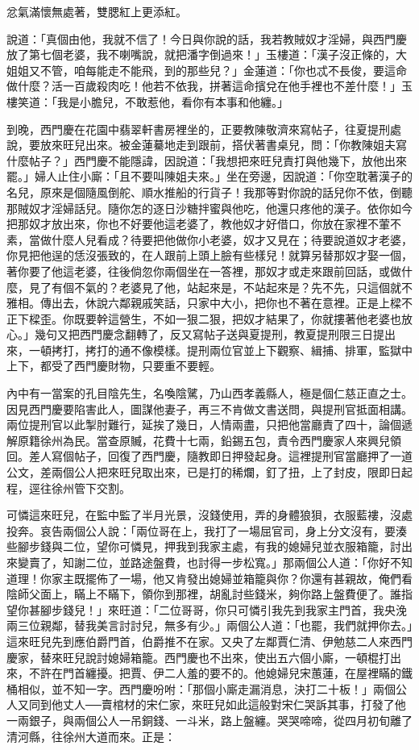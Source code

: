 忿氣滿懷無處著，雙腮紅上更添紅。

說道：「真個由他，我就不信了！今日與你說的話，我若教賊奴才淫婦，與西門慶放了第七個老婆，我不喇嘴說，就把潘字倒過來！」玉樓道：「漢子沒正條的，大姐姐又不管，咱每能走不能飛，到的那些兒？」金蓮道：「你也忒不長俊，要這命做什麼？活一百歲殺肉吃！他若不依我，拼著這命擯兌在他手裡也不差什麼！」玉樓笑道：「我是小膽兒，不敢惹他，看你有本事和他纏。」

到晚，西門慶在花園中翡翠軒書房裡坐的，正要教陳敬濟來寫帖子，往夏提刑處說，要放來旺兒出來。被金蓮驀地走到跟前，搭伏著書桌兒，問：「你教陳姐夫寫什麼帖子？」西門慶不能隱諱，因說道：「我想把來旺兒責打與他幾下，放他出來罷。」婦人止住小廝：「且不要叫陳姐夫來。」坐在旁邊，因說道：「你空耽著漢子的名兒，原來是個隨風倒舵、順水推船的行貨子！我那等對你說的話兒你不依，倒聽那賊奴才淫婦話兒。隨你怎的逐日沙糖拌蜜與他吃，他還只疼他的漢子。依你如今把那奴才放出來，你也不好要他這老婆了，教他奴才好借口，你放在家裡不葷不素，當做什麼人兒看成？待要把他做你小老婆，奴才又見在；待要說道奴才老婆，你見把他逞的恁沒張致的，在人跟前上頭上臉有些樣兒！就算另替那奴才娶一個，著你要了他這老婆，往後倘忽你兩個坐在一答裡，那奴才或走來跟前回話，或做什麼，見了有個不氣的？老婆見了他，站起來是，不站起來是？先不先，只這個就不雅相。傳出去，休說六鄰親戚笑話，只家中大小，把你也不著在意裡。正是上樑不正下樑歪。你既要幹這營生，不如一狠二狠，把奴才結果了，你就摟著他老婆也放心。」幾句又把西門慶念翻轉了，反又寫帖子送與夏提刑，教夏提刑限三日提出來，一頓拷打，拷打的通不像模樣。提刑兩位官並上下觀察、緝捕、排軍，監獄中上下，都受了西門慶財物，只要重不要輕。

內中有一當案的孔目陰先生，名喚陰騭，乃山西孝義縣人，極是個仁慈正直之士。因見西門慶要陷害此人，圖謀他妻子，再三不肯做文書送問，與提刑官抵面相講。兩位提刑官以此掣肘難行，延挨了幾日，人情兩盡，只把他當廳責了四十，論個遞解原籍徐州為民。當查原贓，花費十七兩，鉛錫五包，責令西門慶家人來興兒領回。差人寫個帖子，回復了西門慶，隨教即日押發起身。這裡提刑官當廳押了一道公文，差兩個公人把來旺兒取出來，已是打的稀爛，釘了扭，上了封皮，限即日起程，逕往徐州管下交割。

可憐這來旺兒，在監中監了半月光景，沒錢使用，弄的身體狼狽，衣服藍褸，沒處投奔。哀告兩個公人說：「兩位哥在上，我打了一場屈官司，身上分文沒有，要湊些腳步錢與二位，望你可憐見，押我到我家主處，有我的媳婦兒並衣服箱籠，討出來變賣了，知謝二位，並路途盤費，也討得一步松寬。」那兩個公人道：「你好不知道理！你家主既擺佈了一場，他又肯發出媳婦並箱籠與你？你還有甚親故，俺們看陰師父面上，瞞上不瞞下，領你到那裡，胡亂討些錢米，夠你路上盤費便了。誰指望你甚腳步錢兒！」來旺道：「二位哥哥，你只可憐引我先到我家主門首，我央浼兩三位親鄰，替我美言討討兒，無多有少。」兩個公人道：「也罷，我們就押你去。」這來旺兒先到應伯爵門首，伯爵推不在家。又央了左鄰賈仁清、伊勉慈二人來西門慶家，替來旺兒說討媳婦箱籠。西門慶也不出來，使出五六個小廝，一頓棍打出來，不許在門首纏擾。把賈、伊二人羞的要不的。他媳婦兒宋蕙蓮，在屋裡瞞的鐵桶相似，並不知一字。西門慶吩咐：「那個小廝走漏消息，決打二十板！」兩個公人又同到他丈人──賣棺材的宋仁家，來旺兒如此這般對宋仁哭訴其事，打發了他一兩銀子，與兩個公人一吊銅錢、一斗米，路上盤纏。哭哭啼啼，從四月初旬離了清河縣，往徐州大道而來。正是：

